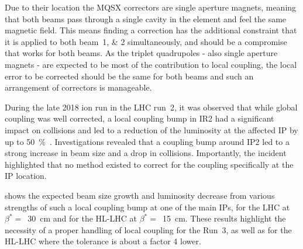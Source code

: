 Due to their location the MQSX correctors are single aperture magnets, meaning that both beams pass through a single cavity in the element and feel the same magnetic field.
This means finding a correction has the additional constraint that it is applied to both beam~\numlist{1;2} simultaneously, and should be a compromise that works for both beams.
As the triplet quadrupoles - also single aperture magnets - are expected to be most of the contribution to local coupling, the local error to be corrected should be the same for both beams and such an arrangement of correctors is manageable.

During the late \num{2018} ion run in the LHC \Gls{run}~\num{2}, it was observed that while global coupling was well corrected, a local coupling bump in IR\num{2} had a significant impact on collisions and led to a reduction of the luminosity at the affected IP by up to \qty{50}{\percent}~\cite{IPAC:Jowett:LHC_2018_Heavy_Ion_Run, IPAC:Tomas:Run2_Experience_View_LHC_HLLHC, CERN:Persson:LHCOpticsCorrectionsEvian2019}.
Investigations revealed that a coupling bump around IP\num{2} led to a strong increase in beam size and a drop in collisions.
Importantly, the incident highlighted that no method existed to correct for the coupling specifically at the IP location.

 shows the expected beam size growth and luminosity decrease from various strengths of such a local coupling bump at one of the main IPs, for the LHC at \(\beta^{*}=\)~\qty{30}{\centi\meter} and for the \acrshort{HL-LHC} at \(\beta^{*}=\)~\qty{15}{\centi\meter}.
These results highlight the necessity of a proper handling of local coupling for the Run~\num{3}, as well as for the HL-LHC where the tolerance is about a factor \num{4} lower.

